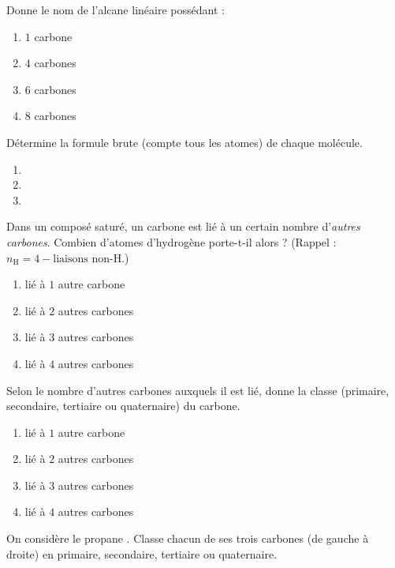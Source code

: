\documentclass[11pt,a4paper]{article}
\begin{document}
\begin{exo}
Donne le nom de l'alcane linéaire possédant :
\begin{enumerate}[label=\alph*)]
  \item $1$ carbone
  \item $4$ carbones
  \item $6$ carbones
  \item $8$ carbones
\end{enumerate}
\end{exo}

\begin{exo}
Détermine la formule brute (compte tous les atomes) de chaque molécule.
\begin{enumerate}[label=\alph*)]
  \item {}
  \item {}
  \item {}
\end{enumerate}
\end{exo}

\begin{exo}
Dans un composé saturé, un carbone est lié à un certain nombre d'\emph{autres carbones}. Combien d'atomes d'hydrogène porte-t-il alors ? (Rappel : $n_{\text{H}}=4-\text{liaisons non-H}$.)
\begin{enumerate}[label=\alph*)]
  \item lié à $1$ autre carbone
  \item lié à $2$ autres carbones
  \item lié à $3$ autres carbones
  \item lié à $4$ autres carbones
\end{enumerate}
\end{exo}

\begin{exo}
Selon le nombre d'autres carbones auxquels il est lié, donne la classe (primaire, secondaire, tertiaire ou quaternaire) du carbone.
\begin{enumerate}[label=\alph*)]
  \item lié à $1$ autre carbone
  \item lié à $2$ autres carbones
  \item lié à $3$ autres carbones
  \item lié à $4$ autres carbones
\end{enumerate}
\end{exo}

\begin{exo}
On considère le propane . Classe chacun de ses trois carbones (de gauche à droite) en primaire, secondaire, tertiaire ou quaternaire.
\end{exo}
\end{document}
